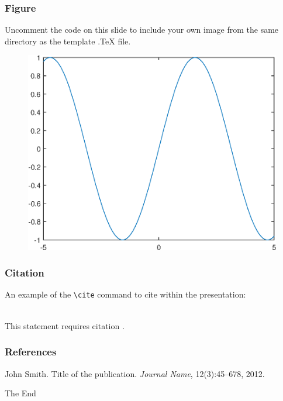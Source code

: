 \documentclass[compress]{beamer}
\numberwithin{figure}{section}
\numberwithin{table}{section}
\numberwithin{equation}{section}
\numberwithin{figure}{section}
\numberwithin{table}{section}
\numberwithin{equation}{section}
\begin{document}
\begin{frame}
\frametitle{Figure}

Uncomment the code on this slide to include your own image from the same directory as the template .TeX file.
\begin{figure}[htp!]
\centering
\includegraphics[width=0.6\linewidth]{Image.eps}
\end{figure}
\end{frame}


\begin{frame}[fragile] %
\frametitle{Citation}
An example of the \verb|\cite| command to cite within the presentation:\\~

This statement requires citation \cite{Smith2012}.
\end{frame}


\begin{frame}
\frametitle{References}
\footnotesize{
\begin{thebibliography}{99} %
 John Smith. Title of the publication. \emph{Journal Name}, 12(3):45--678, 2012.
\end{thebibliography}
}
\end{frame}



\thispagestyle{empty}
\begin{frame}
\Huge{\centerline{The End}}
\end{frame}


\end{document}
